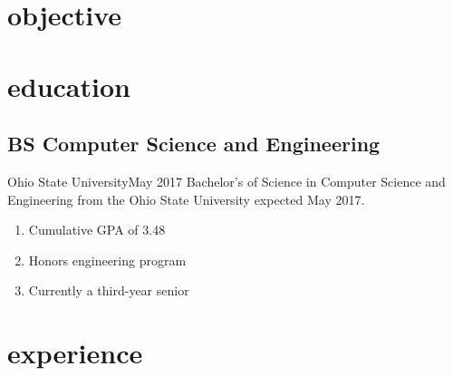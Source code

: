 \documentclass[12pt,letterpaper]{cv}
\begin{document}
	\author{Brandon A. Moore}
	\maketitle
	
	\section{objective}
		
	\section{education}
		\subsection{BS Computer Science and Engineering}{Ohio State University}{May 2017}
			Bachelor's of Science in Computer Science and Engineering from the Ohio State University expected May 2017.
			\begin{enumerate}
				\item Cumulative GPA of 3.48
				\item Honors engineering program
				\item Currently a third-year senior
			\end{enumerate}

	\section{experience}
\end{document}
